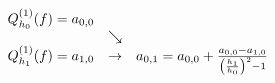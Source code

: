 \begin{align*}
\begin{array}{ccc}
    Q_{h_0}^{(1)}(f) = a_{0,0}
    && \\
    & \searrow & \\
    Q_{h_1}^{(1)}(f) = a_{1,0}
    & \rightarrow &
    a_{0,1}
    = a_{0,0} +
      \frac
      {a_{0,0} - a_{1,0}}
      {\left ( \frac{h_1}{h_0} \right )^2 - 1}
\end{array}
\end{align*}